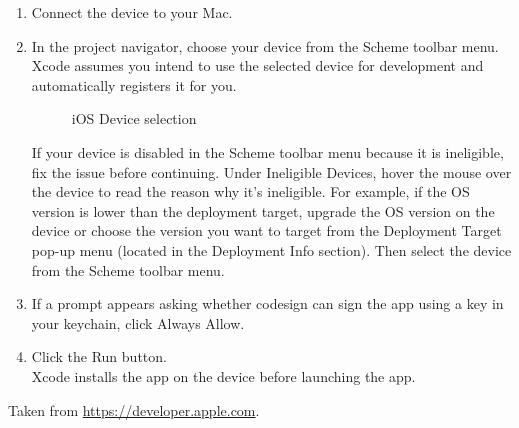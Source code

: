 \begin{enumerate}
\item Connect the device to your Mac.
\item In the project navigator, choose your device from the Scheme toolbar menu.\\ Xcode assumes you intend to use the selected device for development and automatically registers it for you.\\

	\begin{figure}[tbh]
	\begin{center}
	\end{center}
	\caption{iOS Device selection \label{iOSDeviceSelection}}
	\end{figure}
	
 If your device is disabled in the Scheme toolbar menu because it is ineligible, fix the issue before continuing. Under Ineligible Devices, hover the mouse over the device to read the reason why it’s ineligible. For example, if the OS version is lower than the deployment target, upgrade the OS version on the device or choose the version you want to target from the Deployment Target pop-up menu (located in the Deployment Info section). Then select the device from the Scheme toolbar menu.
\item If a prompt appears asking whether codesign can sign the app using a key in your keychain, click Always Allow.
\item Click the Run button.\\

Xcode installs the app on the device before launching the app.
\end{enumerate}

Taken from \href{https://developer.apple.com/library/mac/documentation/IDEs/Conceptual/AppDistributionGuide/LaunchingYourApponDevices/LaunchingYourApponDevices.html}{https://developer.apple.com}. 


